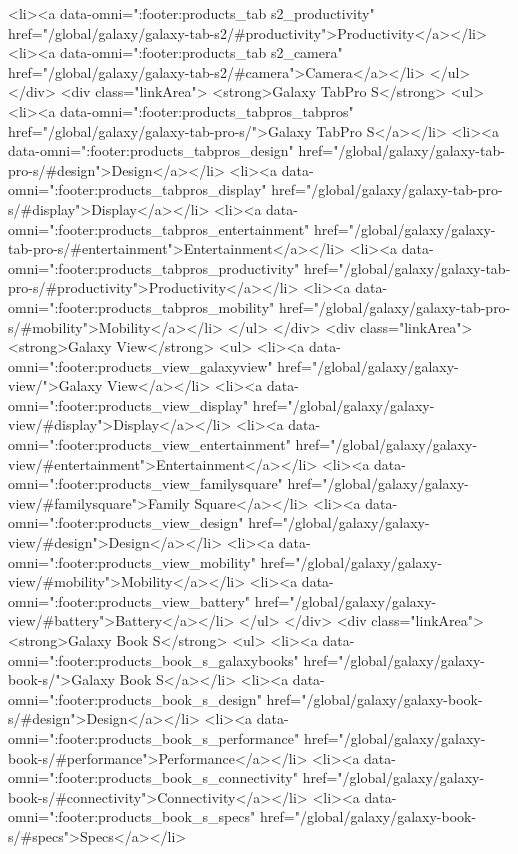 {{{{{{{{{{{{{{{{{{{{{{{{{{{{{{{{{{{{{{{{{{{{{{{{{{{{{				<li><a data-omni=":footer:products_tab s2_productivity" href="/global/galaxy/galaxy-tab-s2/#productivity">Productivity</a></li>
				<li><a data-omni=":footer:products_tab s2_camera" href="/global/galaxy/galaxy-tab-s2/#camera">Camera</a></li>
			</ul>
		</div>
		<div class="linkArea">
			<strong>Galaxy TabPro S</strong>
			<ul>
				<li><a data-omni=":footer:products_tabpros_tabpros" href="/global/galaxy/galaxy-tab-pro-s/">Galaxy TabPro S</a></li>
				<li><a data-omni=":footer:products_tabpros_design" href="/global/galaxy/galaxy-tab-pro-s/#design">Design</a></li>
				<li><a data-omni=":footer:products_tabpros_display" href="/global/galaxy/galaxy-tab-pro-s/#display">Display</a></li>
				<li><a data-omni=":footer:products_tabpros_entertainment" href="/global/galaxy/galaxy-tab-pro-s/#entertainment">Entertainment</a></li>
				<li><a data-omni=":footer:products_tabpros_productivity" href="/global/galaxy/galaxy-tab-pro-s/#productivity">Productivity</a></li>
				<li><a data-omni=":footer:products_tabpros_mobility" href="/global/galaxy/galaxy-tab-pro-s/#mobility">Mobility</a></li>
			</ul>
		</div>
		<div class="linkArea">
			<strong>Galaxy View</strong>
			<ul>
				<li><a data-omni=":footer:products_view_galaxyview" href="/global/galaxy/galaxy-view/">Galaxy View</a></li>
				<li><a data-omni=":footer:products_view_display" href="/global/galaxy/galaxy-view/#display">Display</a></li>
				<li><a data-omni=":footer:products_view_entertainment" href="/global/galaxy/galaxy-view/#entertainment">Entertainment</a></li>
				<li><a data-omni=":footer:products_view_familysquare" href="/global/galaxy/galaxy-view/#familysquare">Family Square</a></li>
				<li><a data-omni=":footer:products_view_design" href="/global/galaxy/galaxy-view/#design">Design</a></li>
				<li><a data-omni=":footer:products_view_mobility" href="/global/galaxy/galaxy-view/#mobility">Mobility</a></li>
				<li><a data-omni=":footer:products_view_battery" href="/global/galaxy/galaxy-view/#battery">Battery</a></li>
			</ul>
		</div>
		<div class="linkArea">
			<strong>Galaxy Book S</strong>
			<ul>
				<li><a data-omni=":footer:products_book_s_galaxybooks" href="/global/galaxy/galaxy-book-s/">Galaxy Book S</a></li>
				<li><a data-omni=":footer:products_book_s_design" href="/global/galaxy/galaxy-book-s/#design">Design</a></li>
				<li><a data-omni=":footer:products_book_s_performance" href="/global/galaxy/galaxy-book-s/#performance">Performance</a></li>
				<li><a data-omni=":footer:products_book_s_connectivity" href="/global/galaxy/galaxy-book-s/#connectivity">Connectivity</a></li>
				<li><a data-omni=":footer:products_book_s_specs" href="/global/galaxy/galaxy-book-s/#specs">Specs</a></li>
}}}}}}}}}}}}}}}}}}}}}}}}}}}}}}}}}}}}}}}}}}}}}}}}}}}}}
